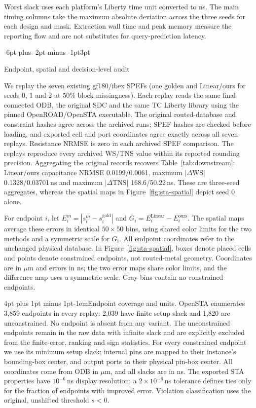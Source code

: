 \documentclass{article}
\makeatletter
\renewcommand{\subsection}{\@startsection{subsection}{2}{\z@}
  {-6pt plus -2pt minus -1pt}{3pt}{\normalsize\sc\raggedright}}
\renewcommand{\paragraph}{\@startsection{paragraph}{4}{\z@}
  {4pt plus 1pt minus 1pt}{-1em}{\normalsize\bf}}
\makeatother
\begin{document}
Worst slack uses each platform's Liberty time unit converted to ns. The
main timing columns take the maximum absolute deviation across the three
seeds for each design and mask. Extraction wall time and peak memory
measure the reporting flow and are not substitutes for query-prediction latency.

\subsection{Endpoint, spatial and decision-level audit}
\label{app:sta-spatial}

We replay the seven existing gf180/ibex SPEFs (one golden and Linear/ours
for seeds 0, 1 and 2 at 50\% block missingness). Each replay reads the same
final connected ODB, the original SDC and the same TC Liberty library using
the pinned OpenROAD/OpenSTA executable. The original routed-database and
constraint hashes agree across the archived runs; SPEF hashes are checked
before loading, and exported cell and port coordinates agree exactly across
all seven replays. Resistance NRMSE is zero in each archived SPEF comparison.
The replays reproduce every archived WS/TNS value within its reported rounding
precision. Aggregating the original records recovers
Table~\ref{tab:downstream}: Linear/ours capacitance NRMSE
0.0199/0.0061, maximum $|\Delta\mathrm{WS}|$ 0.1328/0.03701\,ns and maximum
$|\Delta\mathrm{TNS}|$ 168.6/50.22\,ns. These are three-seed aggregates,
whereas the spatial maps in Figure~\ref{fig:sta-spatial} depict seed 0 alone.

For endpoint $i$, let $E_i^m=|s_i^m-s_i^{\mathrm{gold}}|$ and
$G_i=E_i^{\mathrm{Linear}}-E_i^{\mathrm{ours}}$.
The spatial maps average these errors in identical $50\times50$ bins, using
shared color limits for the two methods and a symmetric scale for $G_i$.
All endpoint coordinates refer to the unchanged physical database.
In Figure~\ref{fig:sta-spatial}, boxes denote placed cells and points denote
constrained endpoints, not routed-metal geometry. Coordinates are in $\mu$m
and errors in ns; the two error maps share color limits, and the difference
map uses a symmetric scale. Gray bins contain no constrained endpoints.

\paragraph{Endpoint coverage and units.}
OpenSTA enumerates 3,859 endpoints in every replay: 2,039 have finite setup
slack and 1,820 are unconstrained. No endpoint is absent from any variant.
The unconstrained endpoints remain in the raw data with infinite slack and
are explicitly excluded from the finite-error, ranking and sign statistics.
For every constrained endpoint we use its minimum setup slack; internal pins
are mapped to their instance's bounding-box center, and output ports to their
physical pin-box center. All coordinates come from ODB in $\mu$m, and all
slacks are in ns. The exported STA properties have $10^{-6}$\,ns display
resolution; a $2\times10^{-6}$\,ns tolerance defines ties only for the fraction
of endpoints with improved error. Violation classification uses the original,
unshifted threshold $s<0$.
\end{document}

